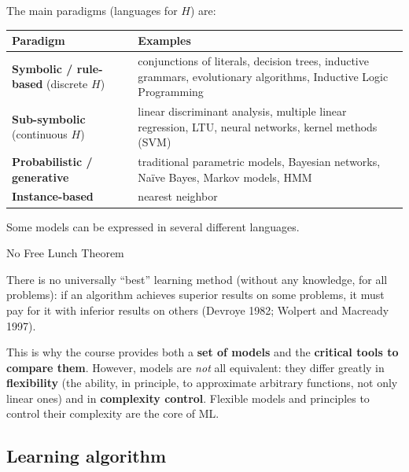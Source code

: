 The main paradigms (languages for \(H\)) are:

{\def\LTcaptype{none} %
\begin{longtable}[]{@{}
  >{\raggedright\arraybackslash}p{}
  >{\raggedright\arraybackslash}p{}@{}}
\toprule\noalign{}
\begin{minipage}[b]{\linewidth}\raggedright
Paradigm
\end{minipage} & \begin{minipage}[b]{\linewidth}\raggedright
Examples
\end{minipage} \\
\midrule\noalign{}
\endhead
\bottomrule\noalign{}
\endlastfoot
\textbf{Symbolic / rule-based} (discrete \(H\)) & conjunctions of
literals, decision trees, inductive grammars, evolutionary algorithms,
Inductive Logic Programming \\
\textbf{Sub-symbolic} (continuous \(H\)) & linear discriminant
analysis, multiple linear regression, LTU, neural networks, kernel
methods (SVM) \\
\textbf{Probabilistic / generative} & traditional parametric models,
Bayesian networks, Naïve Bayes, Markov models, HMM \\
\textbf{Instance-based} & nearest neighbor \\
\end{longtable}
}

Some models can be expressed in several different languages.

\begin{boxtheorem}{No Free Lunch Theorem}

There is no universally ``best'' learning method (without any
knowledge, for all problems): if an algorithm achieves superior results
on some problems, it must pay for it with inferior results on others
(Devroye 1982; Wolpert and Macready 1997).

\end{boxtheorem}

This is why the course provides both a \textbf{set of models} and the
\textbf{critical tools to compare them}. However, models are
\emph{not} all equivalent: they differ greatly in
\textbf{flexibility} (the ability, in principle, to approximate
arbitrary functions, not only linear ones) and in \textbf{complexity
control}. Flexible models and principles to control their complexity
are the core of ML.

\subsection{Learning algorithm}\label{algoritmo-di-apprendimento}

